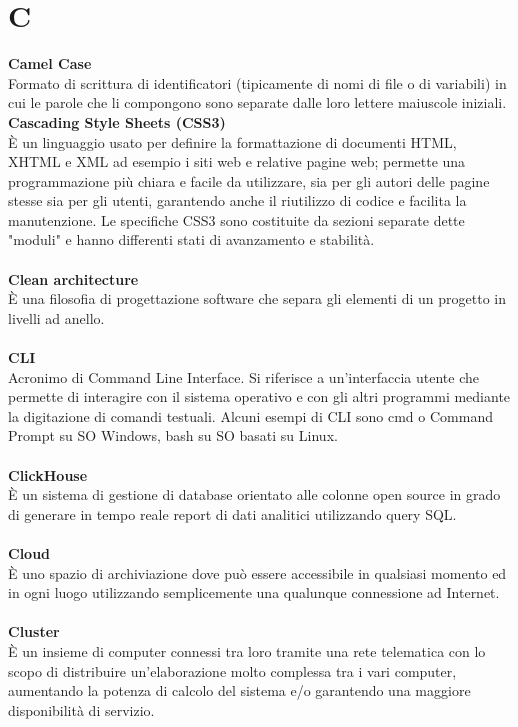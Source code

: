 \section{C}
\textbf{Camel Case}\\
Formato di scrittura di identificatori (tipicamente di nomi di file o di variabili) in cui le parole che li compongono sono separate dalle loro lettere maiuscole iniziali.
\textbf{Cascading Style Sheets (CSS3)}\\
È un linguaggio usato per definire la formattazione di documenti HTML, XHTML e XML ad esempio i siti web e relative pagine web; permette una programmazione più chiara e facile da utilizzare, sia per gli autori delle pagine stesse sia per gli utenti, garantendo anche il riutilizzo di codice e facilita la manutenzione. Le specifiche CSS3 sono costituite da sezioni separate dette "moduli" e hanno differenti stati di avanzamento e stabilità. \\ \\
\textbf{Clean architecture}\\
È una filosofia di progettazione software che separa gli elementi di un progetto in livelli ad anello. \\ \\
\textbf{CLI}\\
Acronimo di Command Line Interface. Si riferisce a un'interfaccia utente che permette di interagire con il sistema operativo e con gli altri programmi mediante la digitazione di comandi testuali. Alcuni esempi di CLI sono cmd o Command Prompt su SO Windows, bash su SO basati su Linux.\\ \\
\textbf{ClickHouse}\\
È un sistema di gestione di database orientato alle colonne open source in grado di generare in tempo reale report di dati analitici utilizzando query SQL. \\ \\
\textbf{Cloud}\\
È uno spazio di archiviazione dove può essere accessibile in qualsiasi momento ed in ogni luogo utilizzando semplicemente una qualunque connessione ad Internet. \\ \\
\textbf{Cluster}\\
È un insieme di computer connessi tra loro tramite una rete telematica con lo scopo di distribuire un'elaborazione molto complessa tra i vari computer, aumentando la potenza di calcolo del sistema e/o garantendo una maggiore disponibilità di servizio. \\ \\
